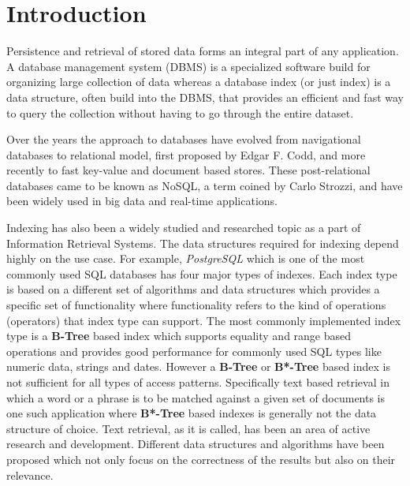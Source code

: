 \chapter{Introduction}
\label{chap:intro}
Persistence and retrieval of stored data forms an integral part of any application.
A database management system (DBMS) is a specialized software build for organizing large collection of data
whereas a database index (or just index) is a data structure, often build into the DBMS,
that provides an efficient and fast way to query the collection without having to go through the entire dataset.

Over the years the approach to databases have evolved from navigational databases
to relational model, first proposed by Edgar F. Codd\cite{codd1970relational},
and more recently to fast key-value and document based stores.
These post-relational databases came to be known as NoSQL, a term coined by Carlo Strozzi\cite{strozziNoSQL},
and have been widely used in big data and real-time applications.

Indexing has also been a widely studied and researched topic as a part of Information Retrieval Systems.
The data structures required for indexing depend highly on the use case.
For example, \textit{PostgreSQL} which is one of the most commonly used SQL databases has four major types of indexes.
Each index type is based on a different set of algorithms and data structures which provides a specific set of
functionality where functionality refers to the kind of operations (operators) that index type can support.
The most commonly implemented index type is a \textbf{B-Tree} based index which supports equality and range based
operations and provides good performance for commonly used SQL types like numeric data, strings and dates.
However a \textbf{B-Tree} or \textbf{B*-Tree} based index is not sufficient for all types of access patterns.
Specifically text based retrieval in which a word or a phrase is to be matched against a given set of documents is one
such application where \textbf{B*-Tree} based indexes is generally not the data structure of choice.
Text retrieval, as it is called, has been an area of active research and development.
Different data structures and algorithms have been proposed which not only focus on the correctness of the results
but also on their relevance.

